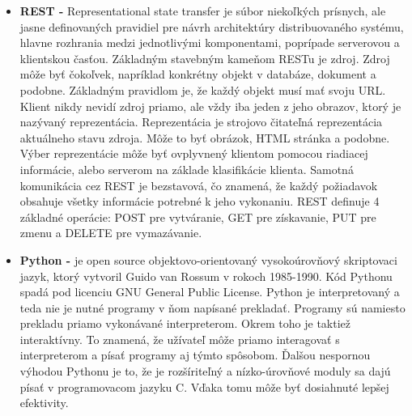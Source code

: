 \begin{itemize}
    \item \textbf{REST -} Representational state transfer je súbor niekoľkých prísnych, ale jasne definovaných pravidiel pre návrh architektúry distribuovaného systému, hlavne rozhrania medzi jednotlivými komponentami, poprípade serverovou a klientskou časťou. Základným stavebným kameňom RESTu je zdroj. Zdroj môže byť čokoľvek, napríklad konkrétny objekt v databáze, dokument a podobne. Základným pravidlom je, že každý objekt musí mať svoju URL. Klient nikdy nevidí zdroj priamo, ale vždy iba jeden z jeho obrazov, ktorý je nazývaný reprezentácia. Reprezentácia je strojovo čitateľná reprezentácia aktuálneho stavu zdroja. Môže to byť obrázok, HTML stránka a podobne. Výber reprezentácie môže byť ovplyvnený klientom pomocou riadiacej informácie, alebo serverom na základe klasifikácie klienta. Samotná komunikácia cez REST je bezstavová, čo znamená, že každý požiadavok obsahuje všetky informácie potrebné k jeho vykonaniu. REST definuje 4 základné operácie: POST pre vytváranie, GET pre získavanie, PUT pre zmenu a DELETE pre vymazávanie. \cite{54r2mhdAeuyxzZPp}
    \item \textbf{Python -} je open source objektovo-orientovaný vysokoúrovňový skriptovaci jazyk, ktorý vytvoril Guido van Rossum v rokoch 1985-1990. Kód Pythonu spadá pod licenciu GNU General Public License. Python je interpretovaný a teda nie je nutné programy v ňom napísané prekladať. Programy sú namiesto prekladu priamo vykonávané interpreterom. Okrem toho je taktiež interaktívny. To znamená, že užívateľ môže priamo interagovať s interpreterom a písať programy aj týmto spôsobom. Ďalšou nespornou výhodou Pythonu je to, že je rozšíriteľný a nízko-úrovňové moduly sa dajú písať v programovacom jazyku C. Vďaka tomu môže byť dosiahnuté lepšej efektivity. \cite{CCnsn576LIGBCH2C}
    

\end{itemize}
